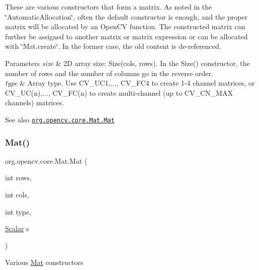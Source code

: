 These are various constructors that form a matrix. As noted in the \char`\"{}\+Automatic\+Allocation\char`\"{}, often the default constructor is enough, and the proper matrix will be allocated by an Open\+CV function. The constructed matrix can further be assigned to another matrix or matrix expression or can be allocated with \char`\"{}\+Mat.\+create\char`\"{}. In the former case, the old content is de-\/referenced.


\begin{DoxyParams}{Parameters}
{\em size} & 2D array size\+: {\ttfamily Size(cols, rows)}. In the {\ttfamily Size()} constructor, the number of rows and the number of columns go in the reverse order. \\
\hline
{\em type} & Array type. Use {\ttfamily C\+V\+\_\+U\+C1,..., C\+V\+\_\+F\+C4} to create 1-\/4 channel matrices, or {\ttfamily C\+V\+\_\+U\+C(n),..., C\+V\+\_\+F\+C(n)} to create multi-\/channel (up to {\ttfamily C\+V\+\_\+\+C\+N\+\_\+\+M\+AX} channels) matrices.\\
\hline
\end{DoxyParams}
\begin{DoxySeeAlso}{See also}
\href{http://docs.opencv.org/modules/core/doc/basic_structures.html#mat-mat}{\tt org.\+opencv.\+core.\+Mat.\+Mat} 
\end{DoxySeeAlso}
\mbox{\label{classorg_1_1opencv_1_1core_1_1_mat_ade8a0d19976457d86412752212d1dbdb}} 
\subsubsection{\texorpdfstring{Mat()}{Mat()}\hspace{0.1cm}{\footnotesize\ttfamily [5/9]}}
{\footnotesize\ttfamily org.\+opencv.\+core.\+Mat.\+Mat (\begin{DoxyParamCaption}\item[{int}]{rows,  }\item[{int}]{cols,  }\item[{int}]{type,  }\item[{\mbox{\hyperlink{classorg_1_1opencv_1_1core_1_1_scalar}{Scalar}}}]{s }\end{DoxyParamCaption})}

Various \mbox{\hyperlink{classorg_1_1opencv_1_1core_1_1_mat}{Mat}} constructors

